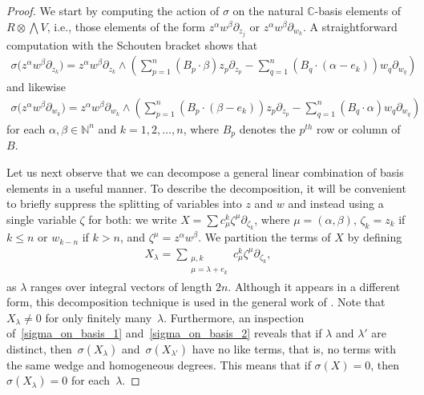 \documentclass[10pt,a4paper]{amsart}
\numberwithin{equation}{section}
\begin{document}
\begin{proof}
We start by computing the action of $\sigma$ on the natural ${\mathbb C}$-basis elements of $R\otimes \bigwedge V$, i.e., those elements of the form $z^\alpha w^\beta\partial_{z_j}$ or $z^\alpha w^\beta \partial_{w_k}$. A straightforward computation with the Schouten bracket shows that
\begin{gather}\label{sigma_on_basis_1}
\sigma\big(z^\alpha w^\beta \partial_{z_k}\big)=z^\alpha w^\beta \partial_{z_k}\wedge\left(\sum_{p=1}^n (B_p\cdot\beta) z_p\partial_{z_p}-\sum_{q=1}^n (B_q\cdot (\alpha-e_k))w_q\partial_{w_q}\right)
\end{gather}
and likewise
\begin{gather}\label{sigma_on_basis_2}
\sigma\big(z^\alpha w^\beta \partial_{w_k}\big)=z^\alpha w^\beta \partial_{w_k}\wedge\left(\sum_{p=1}^n (B_p\cdot(\beta-e_k)) z_p\partial_{z_p}-\sum_{q=1}^n (B_q\cdot \alpha) w_q\partial_{w_q}\right)
\end{gather}
for each $\alpha,\beta\in\mathbb N^n$ and $k=1,2,\dots,n$, where $B_p$ denotes the $p^{th}$ row or column of $B$.

Let us next observe that we can decompose a general linear combination of basis elements in a useful manner. To describe the decomposition, it will be convenient to brief\/ly suppress the splitting of variables into $z$ and $w$ and instead using a single variable $\zeta$ for both: we write $X=\sum c_{\mu}^k \zeta^\mu\partial_{\zeta_k}$, where $\mu=(\alpha, \beta)$, $\zeta_k=z_k$ if $k\leq n$ or $w_{k-n}$ if $k>n$, and $\zeta^\mu=z^\alpha w^\beta$. We partition the terms of $X$ by def\/ining
\begin{gather*}
X_\lambda=\sum_{\substack{\mu, k\\ \mu=\lambda+e_k}} c_{\mu}^k \zeta^\mu \partial_{\zeta_k},
\end{gather*}
as $\lambda$ ranges over integral vectors of length $2n$. Although it appears in a dif\/ferent form, this decomposition technique is used in the general work of \cite{Monnier}. Note that $X_\lambda\ne 0$ for only f\/initely many~$\lambda$. Furthermore, an inspection of~\eqref{sigma_on_basis_1} and~\eqref{sigma_on_basis_2} reveals that if $\lambda$ and $\lambda'$ are distinct, then~$\sigma(X_{\lambda})$ and~$\sigma(X_{\lambda'})$ have no like terms, that is, no terms with the same wedge and homogeneous degrees. This means that if $\sigma(X)=0$, then $\sigma(X_\lambda)=0$ for each~$\lambda$.


\end{proof}
\end{document}
